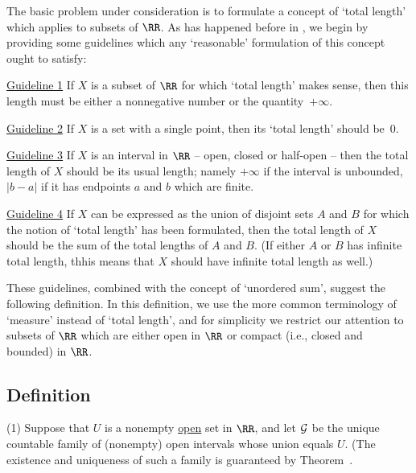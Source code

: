 \V
\V

        The basic problem under consideration is to formulate a concept of `total length' which applies to subsets of ${\RR}$.
    As has happened before in {\TheseNotes}, we begin by providing some guidelines which any `reasonable' formulation of this concept ought to satisfy:

\V


        \underline{Guideline 1} If $X$ is a subset of ${\RR}$ for which `total length' makes sense,
    then this length must be either a nonnegative number or the quantity~$+{\infty}$.

\V

        \underline{Guideline 2} If $X$ is a set with a single point, then its `total length' should be~$0$.

\V


        \underline{Guideline 3} If $X$ is an interval in ${\RR}$ -- open, closed or half-open -- then the total length of $X$ should be its usual length;
    namely $+{\infty}$ if the interval is unbounded, $|b-a|$ if it has endpoints $a$ and $b$ which are finite.

\V

        \underline{Guideline 4} If $X$ can be expressed as the union of disjoint sets $A$ and $B$ for which the notion of `total length' has been formulated,
   then the total length of $X$ should be the sum of the total lengths of $A$ and $B$.
    (If either $A$ or $B$ has infinite total length, thhis means that $X$ should have infinite total length as well.)

\V
\V

        These guidelines, combined with the concept of `unordered sum', suggest the following definition.
    In this definition, we use the more common terminology of `measure' instead of `total length',
    and for simplicity we restrict our attention to subsets of ${\RR}$ which are either open in ${\RR}$ or compact (i.e., closed and bounded) in ${\RR}$.

\V

        \subsection{\small{{\bf Definition}}}
        \label{DefG25.20}

\V

        (1) Suppose that $U$ is a nonempty \underline{open} set in ${\RR}$,
    and let ${\cal G}$ be the unique countable family of (nonempty) open intervals whose union equals $U$.
    (The existence and uniqueness of such a family is guaranteed by Theorem~.

